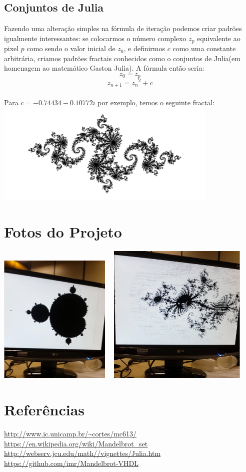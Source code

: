 \documentclass[a4paper, 12pt]{article}
\begin{document}
\subsection{Conjuntos de Julia}
Fazendo uma alteração simples na fórmula de iteração podemos criar padrões igualmente interessantes: se colocarmos o número complexo $z_p$ equivalente ao pixel $p$ como sendo o valor inicial de $z_0$, e definirmos $c$ como uma constante arbitrária, criamos padrões fractais conhecidos como o conjuntos de Julia(em homenagem ao matemático Gaston Julia). A fórmula então seria:
$$ z_0 = z_p$$
$$z_{n+1} = {z_n}^2 + c$$
\\[4cm]
Para $c = -0.74434 -0.10772i$ por exemplo, temos o seguinte fractal:\\[1cm]
\includegraphics[width=0.8\textwidth]{./julia.png}

\section{Fotos do Projeto}
\includegraphics[width=0.4\textwidth]{./imagem1.png}
\ \  \includegraphics[width=0.5\textwidth]{./imagem2.png}\\[1cm]

\section{Referências}
\url{http://www.ic.unicamp.br/~cortes/mc613/}\\
\url{https://en.wikipedia.org/wiki/Mandelbrot_set}\\
\url{http://webserv.jcu.edu/math//vignettes/Julia.htm}\\
\url{https://github.com/imr/Mandelbrot-VHDL}
\end{document}
